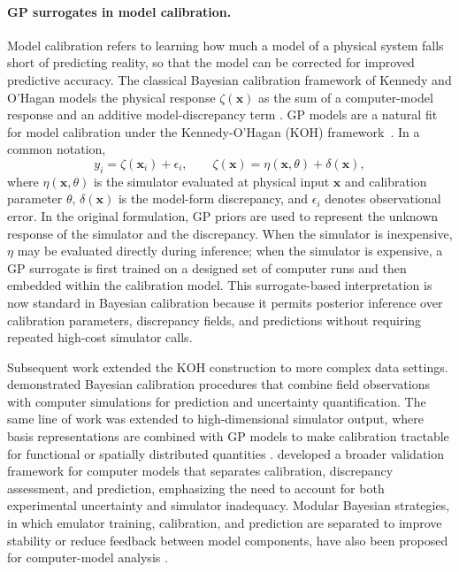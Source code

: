 \documentclass[journal]{new-aiaa}
\newcommand{\x}{\mathbf{x}}
\begin{document}
\paragraph{GP surrogates in model calibration.}
Model calibration refers to learning how much a model of a physical system falls short of predicting reality, so that the model can be corrected for improved predictive accuracy. 
The classical Bayesian calibration framework of Kennedy and O'Hagan models the physical response $\zeta(\x)$ as the sum of a computer-model response and an additive model-discrepancy term \cite{kennedy2001bayesian}. GP models are a natural fit for model calibration under the Kennedy-O'Hagan (KOH) framework~\cite{kennedy2001bayesian,higdon2004combining,higdon2008computer}.
In a common notation,
\begin{equation}
    y_i = \zeta(\x_i) + \epsilon_i, 
    \qquad
    \zeta(\x) = \eta(\x,\theta) + \delta(\x),
    \label{eq:koh_review}
\end{equation}
where $\eta(\x,\theta)$ is the simulator evaluated at physical input $\x$ and calibration parameter $\theta$, $\delta(\x)$ is the model-form discrepancy, and $\epsilon_i$ denotes observational error. In the original formulation, GP priors are used to represent the unknown response of the simulator and the discrepancy. When the simulator is inexpensive, $\eta$ may be evaluated directly during inference; when the simulator is expensive, a GP surrogate is first trained on a designed set of computer runs and then embedded within the calibration model. This surrogate-based interpretation is now standard in Bayesian calibration because it permits posterior inference over calibration parameters, discrepancy fields, and predictions without requiring repeated high-cost simulator calls.

Subsequent work extended the KOH construction to more complex data settings. \citet{higdon2004combining} demonstrated Bayesian calibration procedures that combine field observations with computer simulations for prediction and uncertainty quantification. The same line of work was extended to high-dimensional simulator output, where basis representations are combined with GP models to make calibration tractable for functional or spatially distributed quantities \cite{higdon2008computer}. \citet{bayarri2007framework} developed a broader validation framework for computer models that separates calibration, discrepancy assessment, and prediction, emphasizing the need to account for both experimental uncertainty and simulator inadequacy. Modular Bayesian strategies, in which emulator training, calibration, and prediction are separated to improve stability or reduce feedback between model components, have also been proposed for computer-model analysis \cite{liu2009modularization}.
\end{document}
